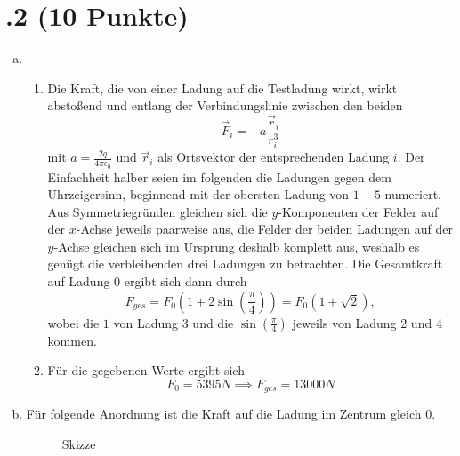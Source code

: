 \section*{\nr.2 \tittwo (10 Punkte)}
\begin{enumerate}[(a)]
\item
\begin{enumerate}[(1)]
\item Die Kraft, die von einer Ladung auf die Testladung wirkt, wirkt abstoßend und entlang der Verbindungslinie zwischen den beiden
\begin{equation}
  \vec F_i=-a \frac{\vec r_i}{r_i^3}
\end{equation}
mit $a=\frac{2q}{4\pi\epsilon_0}$ und $\vec r_i$ als Ortsvektor der entsprechenden Ladung $i$. Der Einfachheit halber seien im folgenden die Ladungen gegen dem Uhrzeigersinn, beginnend mit der obersten Ladung von $1-5$ numeriert.
Aus Symmetriegründen gleichen sich die $y$-Komponenten der Felder auf der $x$-Achse jeweils paarweise aus, die Felder der beiden Ladungen auf der $y$-Achse gleichen sich im Ursprung deshalb komplett aus, weshalb es genügt die verbleibenden drei Ladungen zu betrachten. 
Die Gesamtkraft auf Ladung 0 ergibt sich dann durch
\begin{equation}
  F_{ges}=F_0\left(1+2\sin\left(\frac{\pi}{4}\right)\right) = F_0\left(1+\sqrt{2}\right),
\end{equation}
wobei die $1$ von Ladung 3 und die $\sin\left(\frac{\pi}{4}\right)$ jeweils von Ladung 2 und 4 kommen.
\item Für die gegebenen Werte ergibt sich 
\begin{equation}
  F_0=5395N \implies F_{ges}=13000N
\end{equation}
\end{enumerate}
\item Für folgende Anordnung ist die Kraft auf die Ladung im Zentrum gleich 0.

\begin{figure}[H]
\centering
{}

\caption{Skizze}
\label{fig:s1}
\end{figure}



\end{enumerate}